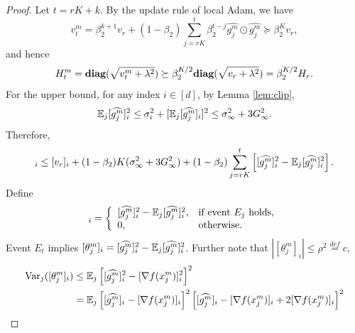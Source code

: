 \documentclass{article} %
\numberwithin{equation}{section}
\begin{document}
\begin{proof}
    Let $t=rK+k$. By the update rule of local Adam, we have
    \begin{equation}
        v_t^m = \beta_2^{k+1}v_r + (1-\beta_2)\sum_{j=rK}^{t}\beta_2^{t-j}\widehat{g_j^m}\odot \widehat{g_j^m} \succeq \beta_2^{K}v_r,
    \end{equation}
    and hence 
    \begin{equation}
        H_t^m = \mbox{\bf diag}(\sqrt{v_t^m + \lambda^2}) \succeq \beta_2^{K/2} \mbox{\bf diag}(\sqrt{v_r + \lambda^2}) = \beta_2^{K/2}H_r.
    \end{equation}
    For the upper bound, for any index $i\in [d]$, by Lemma \ref{lem:clip},
    \begin{equation}
        \mathbb{E}_j [\widehat{g_j^m}]_i^2 \leq \sigma_i^2 + [\mathbb{E}_j [\widehat{g_j^m}]_i]^2 \leq \sigma_\infty^2 + 3G_{\infty}^2.
    \end{equation}
    Therefore,
    \begin{equation}
        [v_t^m]_i \leq [v_r]_i + (1-\beta_2)K(\sigma_\infty^2 + 3G_{\infty}^2)+(1-\beta_2)\sum_{j=rK}^t\left[[\widehat{g_j^m}]_i^2 - \expect_j [\widehat{g_j^m}]_i^2\right].
    \end{equation}
    Define 
    \begin{equation}
        [\theta_j^m]_i = \left\{
            \begin{array}{ll}
                [\widehat{g_j^m}]_i^2 - \expect_j [\widehat{g_j^m}]_i^2, & \text{if event $E_j$ holds,} \\
                0, & \text{otherwise}.
            \end{array}
        \right.
    \end{equation}
    Event $E_t$ implies $[\theta_j^m]_i=[\widehat{g_j^m}]_i^2 - \mathbb{E}_j [\widehat{g_j^m}]_i^2$. 
    Further note that $|[\theta_j^m]_i| \leq \rho^2 \overset{def}{=}c$,
    \begin{equation}
        \begin{aligned}
            \Var_j([\theta_j^m]_i) 
            &\leq \expect_j \left[[\widehat{g_j^m}]_i^2 - [\nabla f(x_j^m)]_i^2\right]^2 \\
            &= \expect_j \left[[\widehat{g_j^m}]_i - [\nabla f(x_j^m)]_i\right]^2\left[[\widehat{g_j^m}]_i - [\nabla f(x_j^m)]_i+2[\nabla f(x_j^m)]_i\right]^2 \\

\end{aligned}
\end{equation}
\end{proof}
\end{document}
